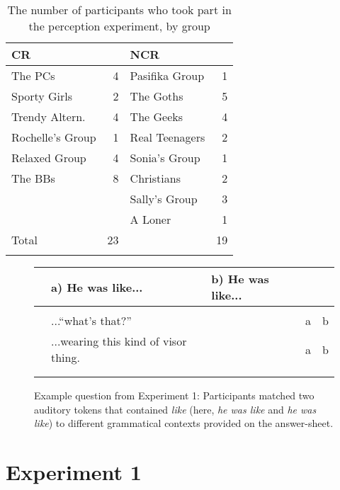 \begin{table}[p]
\caption{The number of participants who took part in the perception experiment, by group}	
	\label{groupsperc}
	 \begin{center}
		\begin{tabular}{lrlr}
\lsptoprule
	      
          
CR & &NCR& \\
  \midrule
The PCs&  4    	&Pasifika Group& 1 \\
Sporty Girls& 2 &The Goths& 5 \\
Trendy Altern.&4&The Geeks& 4 \\
Rochelle's Group& 1 &Real Teenagers& 2\\
Relaxed Group& 4&Sonia's Group&1 \\
The BBs&8      	& Christians&2\\
     &         	& Sally's Group & 3 \\
     & 					&A Loner & 1 \\
     Total &  23&        &   19 \\
  \lspbottomrule
		\end{tabular}
	
	\end{center}
\end{table}

\begin{figure}[p]
 \begin{center}
\caption{Example question from Experiment 1: Participants matched two auditory tokens that contained \textit{like} (here, \textit{he was like} and \textit{he was like}) to different grammatical contexts provided on the answer-sheet.}\label{ExampleExp1} 

		\begin{tabular}{lllrr}\lsptoprule

 
 & a) He was like...	&	b) He was like... & \\
	\midrule
	\\
  & ...``what's that?'' 	&		&a	&b  \\

                    &...wearing this kind of visor thing.	& &a	&b  \\
                    \\	
		\lspbottomrule
		\end{tabular}
	
	\end{center}
\end{figure}
\clearpage


\section{Experiment 1}\label{exp1} 

